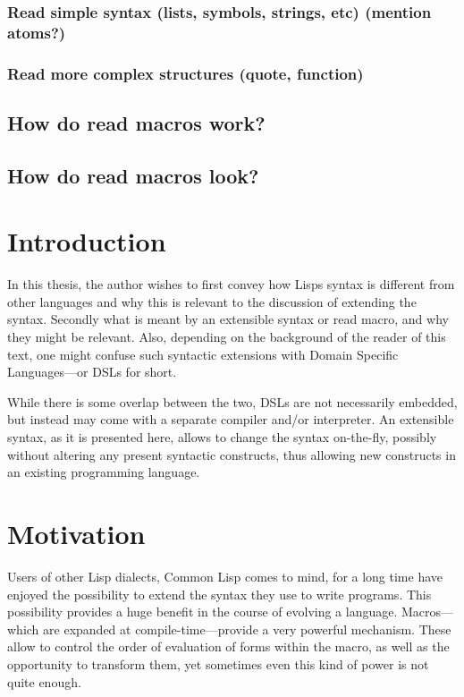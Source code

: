 \documentclass[a4paper]{article}
\newcommand{\cl}{Common Lisp}
\begin{document}
\subsubsection{Read simple syntax (lists, symbols, strings, etc) (mention atoms?)}
\label{sec-1-1-1}
\subsubsection{Read more complex structures (quote, function)}
\label{sec-1-1-2}
\subsection{How do read macros work?}
\label{sec-1-2}
\subsection{How do read macros look?}
\label{sec-1-3}

\section{Introduction}
\label{sec:introduction}
In this thesis, the author wishes to first convey how Lisps syntax is different
from other languages and why this is relevant to the discussion of extending the
syntax.  Secondly what is meant by an extensible syntax or read macro, and why
they might be relevant.  Also, depending on the background of the reader of this
text, one might confuse such syntactic extensions with Domain Specific
Languages—or DSLs for short.

While there is some overlap between the two, DSLs are not necessarily embedded,
but instead may come with a separate compiler and/or interpreter.  An extensible
syntax, as it is presented here, allows to change the syntax on-the-fly,
possibly without altering any present syntactic constructs, thus allowing new
constructs in an existing programming language.

\section{Motivation}
\label{sec:motivation}
Users of other Lisp dialects, \cl{} comes to mind, for a long time have enjoyed
the possibility to extend the syntax they use to write programs.  This
possibility provides a huge benefit in the course of evolving a language.
Macros---which are expanded at compile-time---provide a very powerful mechanism.
These allow to control the order of evaluation of forms within the macro, as
well as the opportunity to transform them, yet sometimes even this kind of power
is not quite enough.
\end{document}
